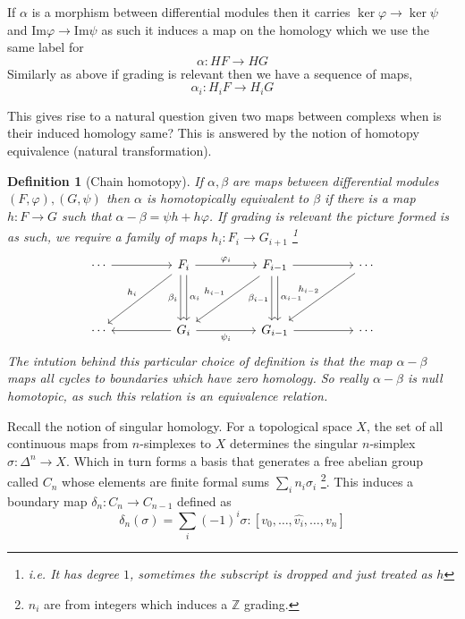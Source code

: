 \documentclass[12pt]{article}
\numberwithin{equation}{section}
\newcommand{\Z}{\mathbb{Z}}
\newcommand{\image}{{\mathrm{Im}}}
\newtheorem{definition}{Definition}[section]
\begin{document}
	If $\alpha $ is a morphism between differential modules then it carries $\ker \varphi \to \ker \psi$ and $\image \varphi \to \image \psi$ as such it induces a map on the homology which we use the same label for $$\alpha: HF \to HG$$
	Similarly as above if grading is relevant then we have a sequence of maps,
	\[ \alpha_i: H_i F \to H_i G \]
	
	This gives rise to a natural question given two maps between complexs when is their induced homology same? This is answered by the notion of homotopy equivalence (natural transformation).
	
	\begin{definition}[Chain homotopy]\label{chainhomotopy}
		If $\alpha, \beta $ are maps between differential modules $(F, \varphi), (G, \psi )$ then $\alpha $ is homotopically equivalent to $\beta $ if there is a map $h: F \to G $ such that $\alpha - \beta = \psi h+ h \varphi$. If grading is relevant the picture formed is as such, we require a family of maps $h_i: F_i \to G_{i+1}$ \footnote{i.e. It has degree $1$, sometimes the subscript is dropped and just treated as $h$}
		\[\begin{tikzcd}
			\cdots && {F_i} && {F_{i-1}} && \cdots \\
			\\
			\cdots && {G_i} && {G_{i-1}} && \cdots
			\arrow["{\varphi_i}", from=1-3, to=1-5]
			\arrow["{\psi_i}"', from=3-3, to=3-5]
			\arrow["{h_{i-1}}"', from=1-5, to=3-3]
			\arrow["{\beta_i}"', shift right, from=1-3, to=3-3]
			\arrow[from=3-3, to=3-1]
			\arrow["{h_i}"', from=1-3, to=3-1]
			\arrow["{\alpha_{i-1}}", shift left, from=1-5, to=3-5]
			\arrow[from=1-1, to=1-3]
			\arrow["{h_{i-2}}"', from=1-7, to=3-5]
			\arrow[from=1-5, to=1-7]
			\arrow["{\alpha_i}", shift left, from=1-3, to=3-3]
			\arrow["{\beta_{i-1}}"', shift right, from=1-5, to=3-5]
			\arrow[from=3-5, to=3-7]
		\end{tikzcd}\]
		The intution behind this particular choice of definition is that the map $\alpha - \beta $ maps all cycles to boundaries which have zero homology. So really $\alpha- \beta$ is null homotopic, as such this relation is an equivalence relation.
	\end{definition}
	Recall the notion of singular homology. For a topological space $X$, the set of all continuous maps from $n$-simplexes to $X$ determines the singular $n$-simplex $\sigma: \Delta^n \to X$. Which in turn forms a basis that generates a free abelian group called $C_n$ whose elements are finite formal sums $
	\sum_i n_i \sigma_i$ \footnote{$n_i$ are from integers which induces a $\Z$ grading.}. This induces a boundary map $\delta_n:C_n \to C_{n-1}$ defined as \[ \delta_n(\sigma) = \sum_i (-1)^i \sigma:[v_0, \dots, \hat{v_i}, \dots, v_n]\]
\end{document}
